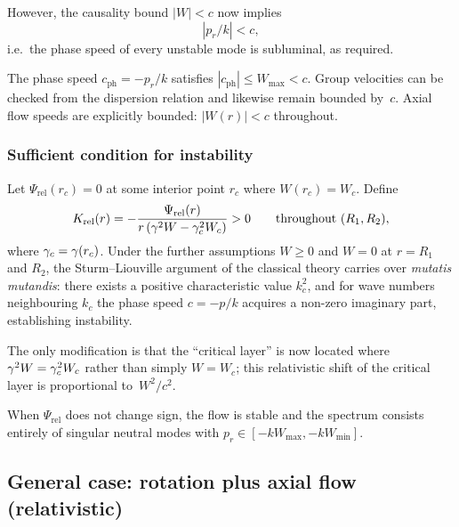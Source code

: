 However, the causality bound $|W|<c$ now implies
\begin{equation}
\label{eq:rel-8-220}
|p_{r}/k| < c,
\end{equation}
i.e.\ the phase speed of every unstable mode is subluminal, as
required.

\begin{causalitycheck}
The phase speed $c_{\mathrm{ph}}=-p_{r}/k$ satisfies
$|c_{\mathrm{ph}}|\le W_{\max}<c$.  Group velocities can be checked
from the dispersion relation and likewise remain bounded by~$c$.
Axial flow speeds are explicitly bounded: $|W(r)|<c$ throughout.
\end{causalitycheck}

\subsubsection{Sufficient condition for instability}
\label{sec:rel-8-79b-iv}

Let $\Psi_{\mathrm{rel}}(r_{c})=0$ at some interior point $r_{c}$
where $W(r_{c})=W_{c}$.  Define
\begin{equation}
\label{eq:rel-8-221}
K_{\mathrm{rel}}(r) = -\frac{\Psi_{\mathrm{rel}}(r)}{r\,(\gamma^{2}W - \gamma_{c}^{2}W_{c})}
  > 0 \qquad\text{throughout } (R_{1},R_{2}),
\end{equation}
where $\gamma_{c}=\gamma(r_{c})$.  Under the further assumptions
$W\ge 0$ and $W=0$ at $r=R_{1}$ and $R_{2}$, the Sturm--Liouville
argument of the classical theory carries over \emph{mutatis mutandis}:
there exists a positive characteristic value $k_{c}^{2}$, and for wave
numbers neighbouring $k_{c}$ the phase speed $c=-p/k$ acquires a
non-zero imaginary part, establishing instability.

The only modification is that the ``critical layer'' is now located
where $\gamma^{2}W=\gamma_{c}^{2}W_{c}$ rather than simply $W=W_{c}$;
this relativistic shift of the critical layer is proportional
to~$W^{2}/c^{2}$.

When $\Psi_{\mathrm{rel}}$ does not change sign, the flow is stable
and the spectrum consists entirely of singular neutral modes with
$p_{r}\in[-kW_{\max},-kW_{\min}]$.

\subsection{General case: rotation plus axial flow (relativistic)}
\label{sec:rel-8-79c}

